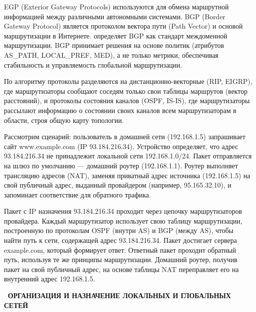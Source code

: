 \documentclass{SibFU-docs}
\begin{document}
EGP (Exterior Gateway Protocols) используются для обмена маршрутной информацией между различными автономными системами. BGP (Border Gateway Protocol) является протоколом вектора пути (Path Vector) и основой маршрутизации в Интернете. \cite{rekhter2006bgp} определяет BGP как стандарт междоменной маршрутизации. BGP принимает решения на основе политик (атрибутов AS\_PATH, LOCAL\_PREF, MED), а не только метрики, обеспечивая стабильность и управляемость глобальной маршрутизации.

По алгоритму протоколы разделяются на дистанционно-векторные (RIP, EIGRP), где маршрутизаторы сообщают соседям только свои таблицы маршрутов (вектор расстояний), и протоколы состояния каналов (OSPF, IS-IS), где маршрутизаторы рассылают информацию о состоянии своих каналов всем маршрутизаторам в области, строя общую карту топологии.


Рассмотрим сценарий: пользователь в домашней сети (192.168.1.5) запрашивает сайт www.example.com (IP 93.184.216.34). Устройство определяет, что адрес 93.184.216.34 не принадлежит локальной сети 192.168.1.0/24. Пакет отправляется на шлюз по умолчанию --- домашний роутер (192.168.1.1). Роутер выполняет трансляцию адресов (NAT), заменяя приватный адрес источника (192.168.1.5) на свой публичный адрес, выданный провайдером (например, 95.165.32.10), и запоминает соответствие для обратного трафика.

Пакет с IP назначения 93.184.216.34 проходит через цепочку маршрутизаторов провайдера. Каждый маршрутизатор использует свою таблицу маршрутизации, построенную по протоколам OSPF (внутри AS) и BGP (между AS), чтобы найти путь к сети, содержащей адрес 93.184.216.34. Пакет достигает сервера example.com, который формирует ответ. Ответный пакет проходит обратный путь, используя те же принципы маршрутизации. Домашний роутер, получив пакет на свой публичный адрес, на основе таблицы NAT переправляет его на внутренний адрес 192.168.1.5.

\newpage
{}
\begin{center}\textbf{\thesection\ ОРГАНИЗАЦИЯ И НАЗНАЧЕНИЕ ЛОКАЛЬНЫХ И ГЛОБАЛЬНЫХ СЕТЕЙ}\end{center}
\vspace*{-1.5em}
\end{document}
